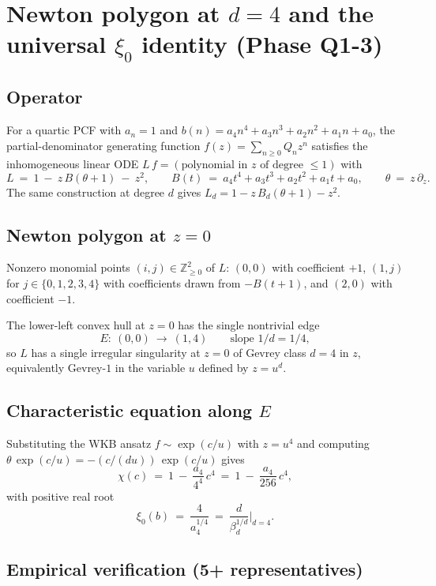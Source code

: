 \section*{Newton polygon at $d=4$ and the universal $\xi_0$ identity (Phase Q1-3)}

\subsection*{Operator}

For a quartic PCF with $a_n=1$ and $b(n)=a_4 n^4 + a_3 n^3 + a_2 n^2
+a_1 n + a_0$, the partial-denominator generating function
$f(z)=\sum_{n\ge 0} Q_n z^n$ satisfies the inhomogeneous linear ODE
$L\,f = (\text{polynomial in } z\text{ of degree }\le 1)$ with
\[
L\ =\ 1\ -\ z\,B(\theta+1)\ -\ z^2,\qquad
B(t)\ =\ a_4 t^4 + a_3 t^3 + a_2 t^2 + a_1 t + a_0,\qquad
\theta\ =\ z\,\partial_z.
\]
The same construction at degree $d$ gives
$L_d=1-z\,B_d(\theta+1)-z^2$.

\subsection*{Newton polygon at $z=0$}

Nonzero monomial points $(i,j)\in\mathbb{Z}_{\ge 0}^2$ of $L$:
$(0,0)$ with coefficient $+1$, $(1,j)$ for $j\in\{0,1,2,3,4\}$ with
coefficients drawn from $-B(t+1)$, and $(2,0)$ with coefficient $-1$.

The lower-left convex hull at $z=0$ has the single nontrivial edge
\[
E:\ (0,0)\ \longrightarrow\ (1,4)
\qquad\text{slope } 1/d = 1/4,
\]
so $L$ has a single irregular singularity at $z=0$ of Gevrey class $d=4$
in $z$, equivalently Gevrey-$1$ in the variable $u$ defined by $z=u^d$.

\subsection*{Characteristic equation along $E$}

Substituting the WKB ansatz $f\sim\exp(c/u)$ with $z=u^4$ and computing
$\theta\,\exp(c/u) = -(c/(d u))\,\exp(c/u)$ gives
\[
\chi(c)\ =\ 1\ -\ \frac{a_4}{4^4}\,c^4\ =\ 1\ -\ \frac{a_4}{256}\,c^4,
\]
with positive real root
\[
\boxed{\ \xi_0(b)\ =\ \frac{4}{a_4^{1/4}}\ =\ \frac{d}{\beta_d^{1/d}}\Big|_{d=4}.\ }
\]

\subsection*{Empirical verification (5+ representatives)}

